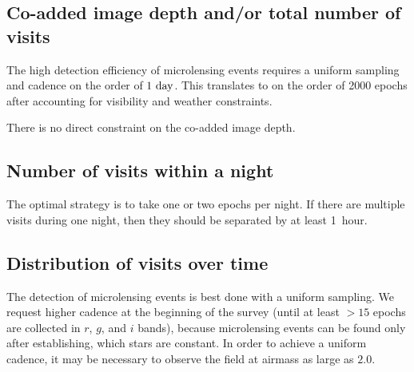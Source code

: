 \documentclass[12pt,letterpaper]{article}
\begin{document}
\subsection{Co-added image depth and/or total number of visits}

The high detection efficiency of microlensing events requires a uniform sampling and
cadence on the order of $1~{\rm day}$.  This translates to on the order of
2000 epochs %
after accounting for visibility and weather constraints.

There is no direct constraint on the co-added image depth.


\subsection{Number of visits within a night}

The optimal strategy is to take one or two epochs per night.  
If there are multiple visits during one night, 
then they should be separated by at least 1~hour.


\subsection{Distribution of visits over time}

The detection of microlensing events is best done with a uniform sampling.  
We request higher cadence at the beginning of the survey 
(until at least $>15$ epochs are collected in $r$, $g$, and $i$ bands), 
because microlensing events can be found only after establishing, 
which stars are constant.  In order to achieve a uniform cadence, 
it may be necessary to observe the field at airmass as large as $2.0$.
\end{document}
